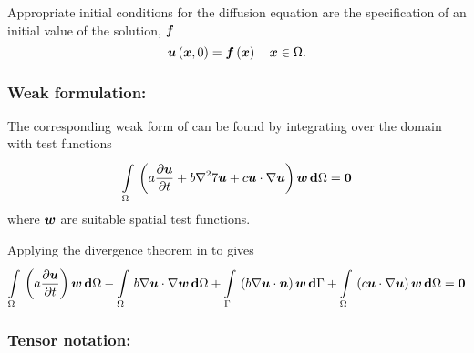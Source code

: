 Appropriate initial conditions for the diffusion equation are the
specification of an initial value of the solution, $\boldsymbol{f}$ \ie
\begin{equation}
  \fnof{\vectr{u}}{\vectr{x},0} = \fnof{\vectr{f}}{\vectr{x}} \quad \vectr{x}\in\Omega.
  \label{eqn:BurgersInitialC} 
\end{equation}

\subsubsection{Weak formulation:}

The corresponding weak form of  can be
found by integrating over the domain with test functions \ie
\begin{equation}
  \gint{\Omega}{}{\pbrac{a\delby{\vectr{u}}{t}+
      b\laplacian{}{7\vectr{u}}+
      c\dotprod{\vectr{u}}{\gradient{}{\vectr{u}}}}\vectr{w}}{\Omega}=\vectr{0}
  \label{eqn:Burgersweakform1}
\end{equation}
where $\boldsymbol{w}$ are suitable spatial test functions.

Applying the divergence theorem in  to  gives
\begin{equation}
  \gint{\Omega}{}{\pbrac{a\delby{\vectr{u}}{t}}\vectr{w}}{\Omega}-
      \gint{\Omega}{}{b\dotprod{\gradient{}{\vectr{u}}}{\gradient{}{\vectr{w}}}}{\Omega}
      +\gint{\Gamma}{}{\pbrac{b\dotprod{\gradient{}{\vectr{u}}}{\normal}}\vectr{w}}{\Gamma}+
      \gint{\Omega}{}{\pbrac{c\dotprod{\vectr{u}}{\gradient{}{\vectr{u}}}}\vectr{w}}{\Omega}
      =\vectr{0}
  \label{eqn:Burgersweakform2}
\end{equation}

\subsubsection{Tensor notation:}


